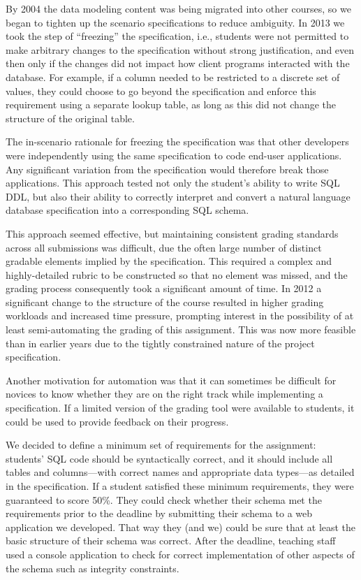 \documentclass[sigconf, authordraft, capitalise]{acmart}
\begin{document}
By 2004 the data modeling content was being migrated into other courses, so we began to tighten up the scenario specifications to reduce ambiguity. In 2013 we took the step of ``freezing'' the specification, i.e., students were not permitted to make arbitrary changes to the specification without strong justification, and even then only if the changes did not impact how client programs interacted with the database. For example, if a column needed to be restricted to a discrete set of values, they could choose to go beyond the specification and enforce this requirement using a separate lookup table, as long as this did not change the structure of the original table.

The in-scenario rationale for freezing the specification was that other developers were independently using the same specification to code end-user applications. Any significant variation from the specification would therefore break those applications. This approach tested not only the student's ability to write SQL DDL, but also their ability to correctly interpret and convert a natural language database specification into a corresponding SQL schema.

This approach seemed effective, but maintaining consistent grading standards across all submissions was difficult, due the often large number of distinct gradable elements implied by the specification. This required a complex and highly-detailed rubric to be constructed so that no element was missed, and the grading process consequently took a significant amount of time. In 2012 a significant change to the structure of the course resulted in higher grading workloads and increased time pressure, prompting interest in the possibility of at least semi-automating the grading of this assignment. This was now more feasible than in earlier years due to the tightly constrained nature of the project specification.

Another motivation for automation was that it can sometimes be difficult for novices to know whether they are on the right track while implementing a specification. If a limited version of the grading tool were available to students, it could be used to provide feedback on their progress.

We decided to define a minimum set of requirements for the assignment: students' SQL code should be syntactically correct, and it should include all tables and columns---with correct names and appropriate data types---as detailed in the specification. If a student satisfied these minimum requirements, they were guaranteed to score 50\%. They could check whether their schema met the requirements prior to the deadline by submitting their schema to a web application we developed. That way they (and we) could be sure that at least the basic structure of their schema was correct. After the deadline, teaching staff used a console application to check for correct implementation of other aspects of the schema such as integrity constraints.
\end{document}
